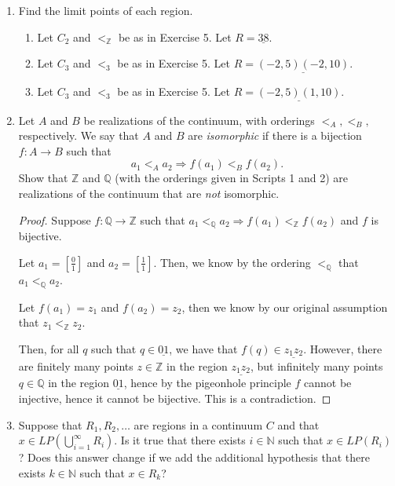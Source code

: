 \documentclass[11pt]{article}
\newcommand{\bbN}{\mathbb{N}}
\newcommand{\bbQ}{\mathbb{Q}}
\newcommand{\bbZ}{\mathbb{Z}}
\renewcommand{\_}[1]{\underline{ #1 }}
\theoremstyle{definition}
\numberwithin{equation}{subsection}
\begin{document}
\begin{enumerate}
\item
		Find the limit points of each region.
		\begin{enumerate}
			\item Let $C_2$ and $<_\bbZ$ be as in Exercise 5.  Let $R = \underline{38}$.
			\item Let $C_3$ and $<_3$ be as in Exercise 5.  Let $R = \underline{(-2,5)(-2,10)}$.
			\item Let $C_3$ and $<_3$ be as in Exercise 5.  Let $R = \underline{(-2,5)(1,10)}$.
		\end{enumerate}


 

\item Let $A$ and $B$ be realizations of the continuum, with orderings $<_A, <_B,$ respectively. We say that $A$ and $B$ are {\em isomorphic} if there is a bijection $f:A\longrightarrow B$ such that 
$$a_1<_A a_2\Longrightarrow f(a_1)<_B f(a_2).$$
Show that $\bbZ$ and $\bbQ$ (with the orderings given in Scripts 1 and 2) are realizations of the continuum that are {\em not} isomorphic.

\begin{proof}
Suppose $f:\bbQ \rightarrow \bbZ$ such that $a_1<_\bbQ a_2\Longrightarrow f(a_1)<_\bbZ f(a_2)$ and $f$ is bijective. 

Let $a_1 = [\frac{0}{1}]$ and $a_2 = [\frac{1}{1}]$. Then, we know by the ordering $<_\bbQ$ that $a_1 <_\bbQ a_2$.

Let $f(a_1)=z_1$ and $f(a_2)=z_2$, then we know by our original assumption that $z_1 <_\bbZ z_2$. 

Then, for all $q$ such that $q \in \_{01}$, we have that $f(q) \in \_{z_1z_2}$. However, there are finitely many points $z \in \bbZ$ in the region $\_{z_1z_2}$, but infinitely many points $q \in \bbQ$ in the region $\_{01}$, hence by the pigeonhole principle $f$ cannot be injective, hence it cannot be bijective. This is a contradiction.



\renewcommand\qedsymbol{QED}
\end{proof}



\item
Suppose that $R_1, R_2, \dots$ are regions in a continuum $C$ and that $x \in LP(\displaystyle \bigcup_{i=1}^\infty R_i)$.  Is it true that there exists $i \in \bbN$ such that $x \in LP(R_i)$?  Does this answer change if we add the additional hypothesis that there exists $k\in \bbN$ such that $x \in R_k$?


\end{enumerate}
\end{document}
